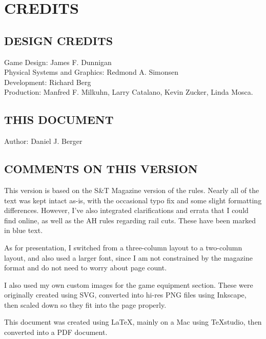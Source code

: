 \section{CREDITS}

\subsection{DESIGN CREDITS}

Game Design: James F. Dunnigan\\
Physical Systems and Graphics: Redmond A. Simonsen\\
Development: Richard Berg\\
Production: Manfred F. Milkuhn, Larry Catalano, Kevin Zucker, Linda Mosca.

\subsection{THIS DOCUMENT}

Author: Daniel J. Berger

\subsection{COMMENTS ON THIS VERSION}

This version is based on the S\&T Magazine version of the rules. Nearly all of the text was kept intact as-is, with the occasional typo fix and some slight formatting differences. However, I've also integrated clarifications and errata that I could find online, as well as the AH rules regarding rail cuts. These have been marked in blue text.

As for presentation, I switched from a three-column layout to a two-column layout, and also used a larger font, since I am not constrained by the magazine format and do not need to worry about page count.

I also used my own custom images for the game equipment section. These were originally created using SVG, converted into hi-res PNG files using Inkscape, then scaled down so they fit into the page properly.

This document was created using LaTeX, mainly on a Mac using TeXstudio, then converted into a PDF document.
